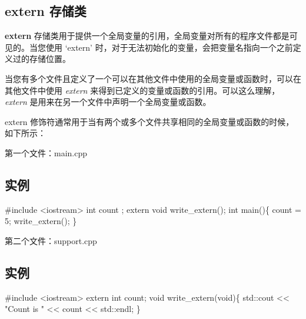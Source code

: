 \documentclass[
]{article}
\newenvironment{Shaded}{}{}
\newcommand{\AttributeTok}[1]{\textcolor[rgb]{0.49,0.56,0.16}{#1}}
\newcommand{\BuiltInTok}[1]{#1}
\newcommand{\DataTypeTok}[1]{\textcolor[rgb]{0.56,0.13,0.00}{#1}}
\newcommand{\DecValTok}[1]{\textcolor[rgb]{0.25,0.63,0.44}{#1}}
\newcommand{\ImportTok}[1]{#1}
\newcommand{\NormalTok}[1]{#1}
\newcommand{\OperatorTok}[1]{\textcolor[rgb]{0.40,0.40,0.40}{#1}}
\newcommand{\PreprocessorTok}[1]{\textcolor[rgb]{0.74,0.48,0.00}{#1}}
\newcommand{\StringTok}[1]{\textcolor[rgb]{0.25,0.44,0.63}{#1}}
\begin{document}
\hypertarget{extern-ux5b58ux50a8ux7c7b}{%
\subsection{extern 存储类}\label{extern-ux5b58ux50a8ux7c7b}}

\textbf{extern}
存储类用于提供一个全局变量的引用，全局变量对所有的程序文件都是可见的。当您使用
`extern'
时，对于无法初始化的变量，会把变量名指向一个之前定义过的存储位置。

当您有多个文件且定义了一个可以在其他文件中使用的全局变量或函数时，可以在其他文件中使用
\emph{extern}
来得到已定义的变量或函数的引用。可以这么理解，\emph{extern}
是用来在另一个文件中声明一个全局变量或函数。

extern
修饰符通常用于当有两个或多个文件共享相同的全局变量或函数的时候，如下所示：

第一个文件：main.cpp

\hypertarget{ux5b9eux4f8b-3}{%
\subsection{实例}\label{ux5b9eux4f8b-3}}

\begin{Shaded}
\begin{Highlighting}[]
\PreprocessorTok{\#include }\ImportTok{\textless{}iostream\textgreater{}}
\DataTypeTok{int}\NormalTok{ count }\OperatorTok{;}
\AttributeTok{extern} \DataTypeTok{void}\NormalTok{ write\_extern}\OperatorTok{();} 
\DataTypeTok{int}\NormalTok{ main}\OperatorTok{()\{}
\NormalTok{   count }\OperatorTok{=} \DecValTok{5}\OperatorTok{;}
\NormalTok{   write\_extern}\OperatorTok{();}
\OperatorTok{\}}
\end{Highlighting}
\end{Shaded}

第二个文件：support.cpp

\hypertarget{ux5b9eux4f8b-4}{%
\subsection{实例}\label{ux5b9eux4f8b-4}}

\begin{Shaded}
\begin{Highlighting}[]
\PreprocessorTok{\#include }\ImportTok{\textless{}iostream\textgreater{}}
\AttributeTok{extern} \DataTypeTok{int}\NormalTok{ count}\OperatorTok{;} 
\DataTypeTok{void}\NormalTok{ write\_extern}\OperatorTok{(}\DataTypeTok{void}\OperatorTok{)\{}
   \BuiltInTok{std::}\NormalTok{cout}\OperatorTok{ \textless{}\textless{}} \StringTok{"Count is "} \OperatorTok{\textless{}\textless{}}\NormalTok{ count }\OperatorTok{\textless{}\textless{}} \BuiltInTok{std::}\NormalTok{endl}\OperatorTok{;}
\OperatorTok{\}}
\end{Highlighting}
\end{Shaded}
\end{document}
